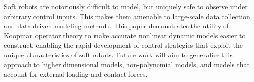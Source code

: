 Soft robots are notoriously difficult to model, but uniquely safe to observe under arbitrary control inputs.
This makes them amenable to large-scale data collection and data-driven modeling methods. 
This paper demonstrates the utility of Koopman operator theory to make accurate nonlinear dynamic models easier to construct, enabling  the  rapid  development  of control strategies that exploit the unique characteristics of soft robots.
Future work will aim to generalize this approach to higher dimensional models, non-polynomial models, and models that account for external loading and contact forces.